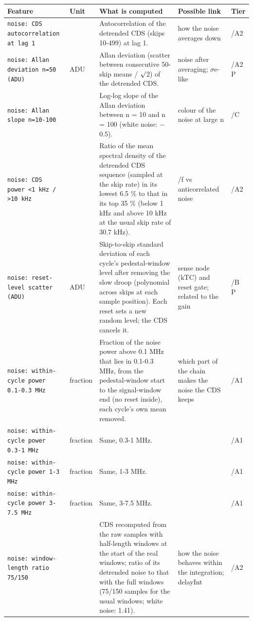 \documentclass[10pt]{article}
\renewcommand{\_}{\oldunderscore\allowbreak}
\begin{document}
\begin{longtable}{>{\raggedright\arraybackslash}p{}>{\raggedright\arraybackslash}p{}>{\raggedright\arraybackslash}p{}>{\raggedright\arraybackslash}p{}>{\raggedright\arraybackslash}p{}}
\toprule Feature & Unit & What is computed & Possible link & Tier \\ \midrule \endhead
\bottomrule \endfoot
\texttt{noise: CDS autocorrelation at lag 1} &  & Autocorrelation of the detrended CDS (skips 10-499) at lag 1. & how the noise averages down & 0/A2 \\
\texttt{noise: Allan deviation n=50 (ADU)} & ADU & Allan deviation (scatter between consecutive 50-skip means / $\surd$2) of the detrended CDS. & noise after averaging; $\sigma$e-like & 0/A2 P \\
\texttt{noise: Allan slope n=10-100} &  & Log-log slope of the Allan deviation between n = 10 and n = 100 (white noise: $-$0.5). & colour of the noise at large n & 0/C \\
\texttt{noise: CDS power \textless{}1 kHz / \textgreater{}10 kHz} &  & Ratio of the mean spectral density of the detrended CDS sequence (sampled at the skip rate) in its lowest 6.5 \% to that in its top 35 \% (below 1 kHz and above 10 kHz at the usual skip rate of 30.7 kHz). & 1/f vs anticorrelated noise & 0/A2 \\
\texttt{noise: reset-level scatter (ADU)} & ADU & Skip-to-skip standard deviation of each cycle's pedestal-window level after removing the slow droop (polynomial across skips at each sample position). Each reset sets a new random level; the CDS cancels it. & sense node (kTC) and reset gate; related to the gain & 0/B P \\
\texttt{noise: within-cycle power 0.1-0.3 MHz} & fraction & Fraction of the noise power above 0.1 MHz that lies in 0.1-0.3 MHz, from the pedestal-window start to the signal-window end (no reset inside), each cycle's own mean removed. & which part of the chain makes the noise the CDS keeps & 0/A1 \\
\texttt{noise: within-cycle power 0.3-1 MHz} & fraction & Same, 0.3-1 MHz. &  & 0/A1 \\
\texttt{noise: within-cycle power 1-3 MHz} & fraction & Same, 1-3 MHz. &  & 0/A1 \\
\texttt{noise: within-cycle power 3-7.5 MHz} & fraction & Same, 3-7.5 MHz. &  & 0/A1 \\
\texttt{noise: window-length ratio 75/150} &  & CDS recomputed from the raw samples with half-length windows at the start of the real windows; ratio of its detrended noise to that with the full windows (75/150 samples for the usual windows; white noise: 1.41). & how the noise behaves within the integration; delayInt & 0/A2 \\

\end{longtable}
\end{document}
